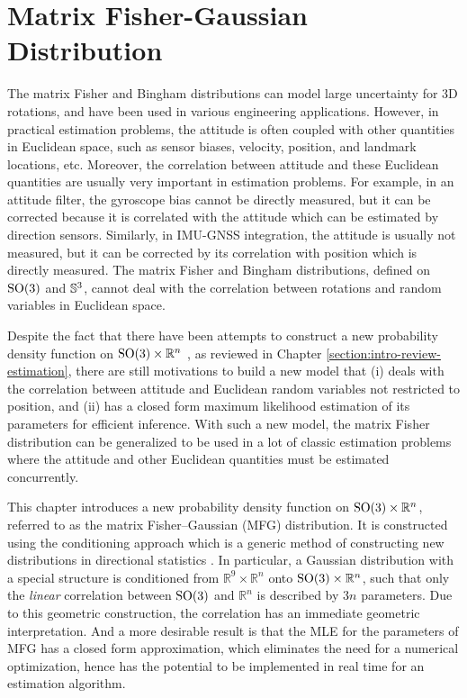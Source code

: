 
\chapter{Matrix Fisher-Gaussian Distribution} \label{chap:MFG}

The matrix Fisher and Bingham distributions can model large uncertainty for 3D rotations, and have been used in various engineering applications.
However, in practical estimation problems, the attitude is often coupled with other quantities in Euclidean space, such as sensor biases, velocity, position, and landmark locations, etc.
Moreover, the correlation between attitude and these Euclidean quantities are usually very important in estimation problems.
For example, in an attitude filter, the gyroscope bias cannot be directly measured, but it can be corrected because it is correlated with the attitude which can be estimated by direction sensors.
Similarly, in IMU-GNSS integration, the attitude is usually not measured, but it can be corrected by its correlation with position which is directly measured.
The matrix Fisher and Bingham distributions, defined on $\mathrm{SO}(3)$ and $\mathbb{S}^3$, cannot deal with the correlation between rotations and random variables in Euclidean space.

Despite the fact that there have been attempts to construct a new probability density function on $\mathrm{SO}(3) \times \mathbb{R}^n$ \cite{darling2016uncertainty,markley2006attitude}, as reviewed in Chapter \ref{section:intro-review-estimation}, there are still motivations to build a new model that
(i) deals with the correlation between attitude and Euclidean random variables not restricted to position,
and (ii) has a closed form maximum likelihood estimation of its parameters for efficient inference.
With such a new model, the matrix Fisher distribution can be generalized to be used in a lot of classic estimation problems where the attitude and other Euclidean quantities must be estimated concurrently.

This chapter introduces a new probability density function on $\mathrm{SO}(3)\times \mathbb{R}^n$, referred to as the matrix Fisher--Gaussian (MFG) distribution.
It is constructed using the conditioning approach which is a generic method of constructing new distributions in directional statistics \cite{pewsey2021recent}.
In particular, a Gaussian distribution with a special structure is conditioned from $\mathbb{R}^9\times \mathbb{R}^n$ onto $\mathrm{SO}(3)\times \mathbb{R}^n$, such that only the \textit{linear} correlation between $\mathrm{SO}(3)$ and $\mathbb{R}^n$ is described by $3n$ parameters.
Due to this geometric construction, the correlation has an immediate geometric interpretation.
And a more desirable result is that the MLE for the parameters of MFG has a closed form approximation, which eliminates the need for a numerical optimization, hence has the potential to be implemented in real time for an estimation algorithm.

